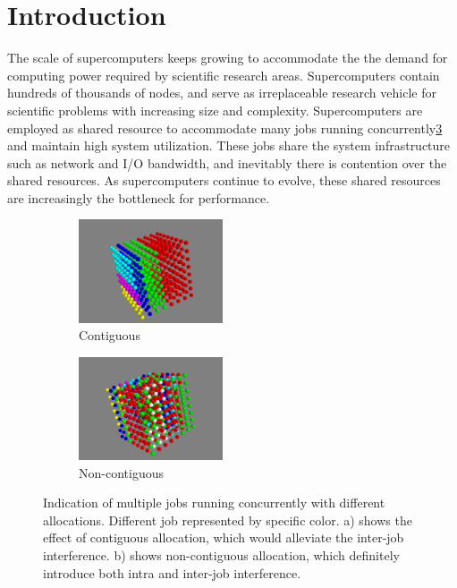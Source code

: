 \documentclass[conference]{IEEEtran}
\begin{document}
\IEEEpeerreviewmaketitle


\section{Introduction} 
\label{sec: intro}

The scale of supercomputers keeps growing to accommodate the the demand for computing power required by scientific research areas. Supercomputers contain hundreds of thousands of nodes, and serve as irreplaceable research vehicle for scientific problems with increasing size and complexity. Supercomputers are employed as shared resource to accommodate many jobs running concurrently\ref{fig: overview} and maintain high system utilization. These jobs share the system infrastructure such as network and I/O bandwidth, and inevitably there is contention over the shared resources. As supercomputers continue to evolve, these shared resources are increasingly the bottleneck for performance.


\begin{figure}[h!]
    \centering
    \begin{subfigure}[t]{0.2\textwidth}
        \centering
        \includegraphics[height=1.2in]{figs/goodallocation}
        \caption{Contiguous}
        \label{fig:overview_sub1}
    \end{subfigure}%
    \hspace{1em}%
    \begin{subfigure}[t]{0.2\textwidth}
        \centering
        \includegraphics[height=1.2in]{figs/badallocation}
        \caption{Non-contiguous}
        \label{fig:overview_sub2}
    \end{subfigure}%
   \caption{Indication of multiple jobs running concurrently with different allocations. Different job represented by specific color. a) shows the effect of contiguous allocation, which would alleviate the inter-job interference. b) shows non-contiguous allocation, which definitely introduce both intra and inter-job interference. }
   \label{fig: overview}
\end{figure}
\end{document}

